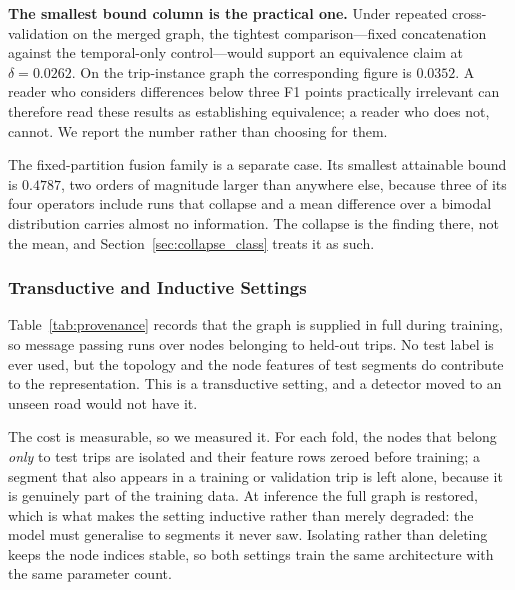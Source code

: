 \documentclass[journal]{IEEEtran}
\begin{document}
\textbf{The smallest bound column is the practical one.} Under repeated
cross-validation on the merged graph, the tightest comparison---fixed
concatenation against the temporal-only control---would support an equivalence
claim at $\delta = 0.0262$. On the trip-instance graph the corresponding
figure is $0.0352$. A reader who considers differences below three F1 points
practically irrelevant can therefore read these results as establishing
equivalence; a reader who does not, cannot. We report the number rather than
choosing for them.

The fixed-partition fusion family is a separate case. Its smallest attainable
bound is $0.4787$, two orders of magnitude larger than anywhere else, because
three of its four operators include runs that collapse and a mean difference
over a bimodal distribution carries almost no information. The collapse is the
finding there, not the mean, and Section~\ref{sec:collapse_class} treats it as
such.

\subsubsection{Transductive and Inductive Settings}
\label{sec:inductive}
Table~\ref{tab:provenance} records that the graph is supplied in full during
training, so message passing runs over nodes belonging to held-out trips. No
test label is ever used, but the topology and the node features of test
segments do contribute to the representation. This is a transductive setting,
and a detector moved to an unseen road would not have it.

The cost is measurable, so we measured it. For each fold, the nodes that
belong \emph{only} to test trips are isolated and their feature rows zeroed
before training; a segment that also appears in a training or validation trip
is left alone, because it is genuinely part of the training data. At inference
the full graph is restored, which is what makes the setting inductive rather
than merely degraded: the model must generalise to segments it never saw.
Isolating rather than deleting keeps the node indices stable, so both settings
train the same architecture with the same parameter count.
\end{document}
